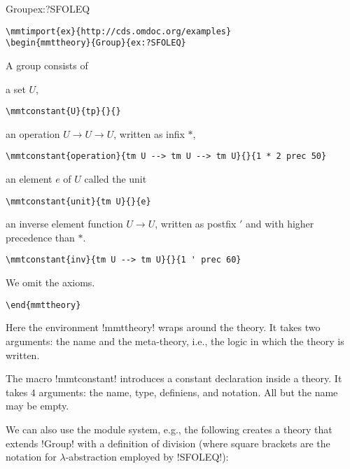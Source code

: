 \begin{mmttheory}{Group}{ex:?SFOLEQ}
\begin{lstlisting}
\mmtimport{ex}{http://cds.omdoc.org/examples}
\begin{mmttheory}{Group}{ex:?SFOLEQ}
\end{lstlisting}

A group consists of
\begin{compactitem}
 \item a set $U$,
\begin{lstlisting}
\mmtconstant{U}{tp}{}{}
\end{lstlisting}

 \item an operation $U\to U \to U$, written as infix $*$,
\begin{lstlisting}
\mmtconstant{operation}{tm U --> tm U --> tm U}{}{1 * 2 prec 50}
\end{lstlisting}

 \item an element $e$ of $U$ called the unit
\begin{lstlisting}
\mmtconstant{unit}{tm U}{}{e}
\end{lstlisting}

\item an inverse element function $U\to U$, written as postfix $'$ and with higher precedence than $*$.
\begin{lstlisting}
\mmtconstant{inv}{tm U --> tm U}{}{1 ' prec 60}
\end{lstlisting}
\end{compactitem}
We omit the axioms.

\end{mmttheory}
\begin{lstlisting}
\end{mmttheory}
\end{lstlisting}


Here the environment !mmttheory! wraps around the theory.
It takes two arguments: the name and the meta-theory, i.e., the logic in which the theory is written.

The macro !mmtconstant! introduces a constant declaration inside a theory.
It takes $4$ arguments: the name, type, definiens, and notation. All but the name may be empty.

We can also use the \mmt module system, e.g., the following creates a theory that extends !Group! with a definition of division (where square brackets are the notation for $\lambda$-abstraction employed by !SFOLEQ!):

